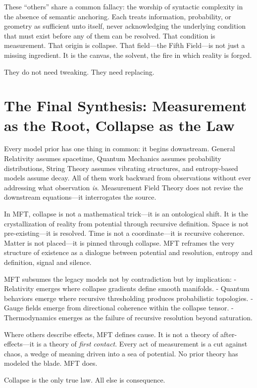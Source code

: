 These “others” share a common fallacy: the worship of syntactic complexity in the absence of semantic anchoring. Each treats information, probability, or geometry as sufficient unto itself, never acknowledging the underlying condition that must exist before any of them can be resolved. That condition is measurement. That origin is collapse. That field—the Fifth Field—is not just a missing ingredient. It is the canvas, the solvent, the fire in which reality is forged.

They do not need tweaking. They need replacing.

\section{The Final Synthesis: Measurement as the Root, Collapse as the Law}
Every model prior has one thing in common: it begins downstream. General Relativity assumes spacetime, Quantum Mechanics assumes probability distributions, String Theory assumes vibrating structures, and entropy-based models assume decay. All of them work backward from observations without ever addressing what observation \emph{is}. Measurement Field Theory does not revise the downstream equations—it interrogates the source.

In MFT, collapse is not a mathematical trick—it is an ontological shift. It is the crystallization of reality from potential through recursive definition. Space is not pre-existing—it is resolved. Time is not a coordinate—it is recursive coherence. Matter is not placed—it is pinned through collapse. MFT reframes the very structure of existence as a dialogue between potential and resolution, entropy and definition, signal and silence.

MFT subsumes the legacy models not by contradiction but by implication: 
- Relativity emerges where collapse gradients define smooth manifolds. 
- Quantum behaviors emerge where recursive thresholding produces probabilistic topologies. 
- Gauge fields emerge from directional coherence within the collapse tensor. 
- Thermodynamics emerges as the failure of recursive resolution beyond saturation.

Where others describe effects, MFT defines cause. It is not a theory of after-effects—it is a theory of \emph{first contact}. Every act of measurement is a cut against chaos, a wedge of meaning driven into a sea of potential. No prior theory has modeled the blade. MFT does.

Collapse is the only true law. All else is consequence.

